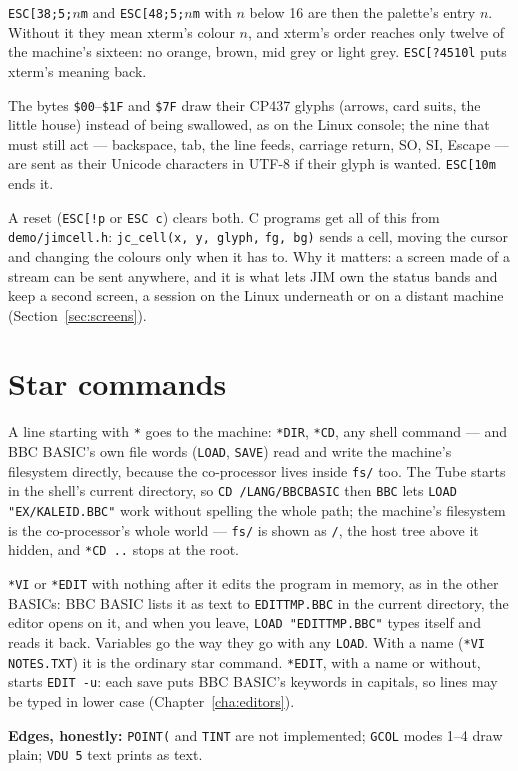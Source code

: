 \begin{description}[leftmargin=1.4em,style=nextline]
\item[\texttt{ESC [ ? 4510 h} --- the palette's own colours]
  \verb|ESC[38;5;|$n$\verb|m| and \verb|ESC[48;5;|$n$\verb|m| with $n$
  below 16 are then the palette's entry $n$. Without it they mean xterm's
  colour $n$, and xterm's order reaches only twelve of the machine's
  sixteen: no orange, brown, mid grey or light grey.
  \verb|ESC[?4510l| puts xterm's meaning back.
\item[\texttt{ESC [ 11 m} --- glyphs for control bytes]
  The bytes \texttt{\$00}--\texttt{\$1F} and \texttt{\$7F} draw their
  CP437 glyphs (arrows, card suits, the little house) instead of being
  swallowed, as on the Linux console; the nine that must still act ---
  backspace, tab, the line feeds, carriage return, SO, SI, Escape --- are
  sent as their Unicode characters in UTF-8 if their glyph is wanted.
  \verb|ESC[10m| ends it.
\end{description}

\noindent A reset (\verb|ESC[!p| or \verb|ESC c|) clears both. C programs
get all of this from \texttt{demo/jimcell.h}: \verb|jc_cell(x, y, glyph,|
\verb|fg, bg)| sends a cell, moving the cursor and changing the colours
only when it has to. Why it matters: a screen made of a stream can be sent
anywhere, and it is what lets JIM own the status bands and keep a second
screen, a session on the Linux underneath or on a distant machine
(Section~\ref{sec:screens}).

\section{Star commands}
A line starting with \verb|*| goes to the machine: \verb|*DIR|, \verb|*CD|,
any shell command --- and BBC BASIC's own file words (\verb|LOAD|,
\verb|SAVE|) read and write the machine's filesystem directly, because the
co-processor lives inside \texttt{fs/} too. The Tube starts in the shell's
current directory, so \verb|CD /LANG/BBCBASIC| then \verb|BBC| lets
\verb|LOAD "EX/KALEID.BBC"| work without spelling the whole path; the machine's
filesystem is the co-processor's whole world --- \texttt{fs/} is shown as
\texttt{/}, the host tree above it hidden, and \verb|*CD ..| stops at the
root.

\verb|*VI| or \verb|*EDIT| with nothing after it edits the program in
memory, as in the other BASICs: BBC BASIC lists it as text to
\texttt{EDITTMP.BBC} in the current directory, the editor opens on it,
and when you leave, \verb|LOAD "EDITTMP.BBC"| types itself and reads it
back. Variables go the way they go with any \verb|LOAD|. With a name
(\verb|*VI NOTES.TXT|) it is the ordinary star command.
\verb|*EDIT|, with a name or without, starts \verb|EDIT -u|: each save
puts BBC BASIC's keywords in capitals, so lines may be typed in lower case
(Chapter~\ref{cha:editors}).

\begin{aside}
\textbf{Edges, honestly:} \texttt{POINT(} and \texttt{TINT} are not
implemented; \texttt{GCOL} modes 1--4 draw plain; \texttt{VDU 5} text
prints as text.
\end{aside}
